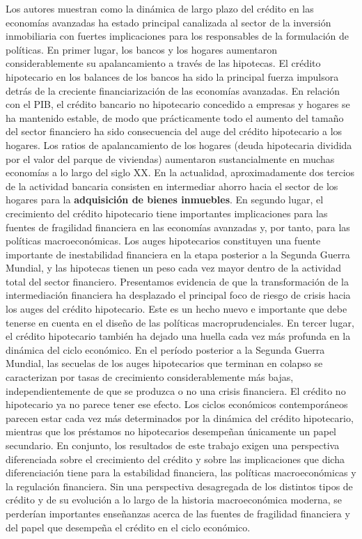 \documentclass[10pt,a4paper]{article}
\begin{document}
Los autores muestran como la dinámica de largo plazo del crédito en las economías avanzadas ha estado principal canalizada al sector de la inversión inmobiliaria con fuertes implicaciones para los responsables de la formulación de políticas. En primer lugar, los bancos y los hogares aumentaron considerablemente su apalancamiento a través de las hipotecas. El crédito hipotecario en los balances de los bancos ha sido la principal fuerza impulsora detrás de la creciente financiarización de las economías avanzadas. En relación con el PIB, el crédito bancario no hipotecario concedido a empresas y hogares se ha mantenido estable, de modo que prácticamente todo el aumento del tamaño del sector financiero ha sido consecuencia del auge del crédito hipotecario a los hogares. Los ratios de apalancamiento de los hogares (deuda hipotecaria dividida por el valor del parque de viviendas) aumentaron sustancialmente en muchas economías a lo largo del siglo XX. En la actualidad, aproximadamente dos tercios de la actividad bancaria consisten en intermediar ahorro hacia el sector de los hogares para la \textbf{adquisición de bienes inmuebles}. En segundo lugar, el crecimiento del crédito hipotecario tiene importantes implicaciones para las fuentes de fragilidad financiera en las economías avanzadas y, por tanto, para las políticas macroeconómicas. Los auges hipotecarios constituyen una fuente importante de inestabilidad financiera en la etapa posterior a la Segunda Guerra Mundial, y las hipotecas tienen un peso cada vez mayor dentro de la actividad total del sector financiero. Presentamos evidencia de que la transformación de la intermediación financiera ha desplazado el principal foco de riesgo de crisis hacia los auges del crédito hipotecario. Este es un hecho nuevo e importante que debe tenerse en cuenta en el diseño de las políticas macroprudenciales. En tercer lugar, el crédito hipotecario también ha dejado una huella cada vez más profunda en la dinámica del ciclo económico. En el período posterior a la Segunda Guerra Mundial, las secuelas de los auges hipotecarios que terminan en colapso se caracterizan por tasas de crecimiento considerablemente más bajas, independientemente de que se produzca o no una crisis financiera. El crédito no hipotecario ya no parece tener ese efecto. Los ciclos económicos contemporáneos parecen estar cada vez más determinados por la dinámica del crédito hipotecario, mientras que los préstamos no hipotecarios desempeñan únicamente un papel secundario. En conjunto, los resultados de este trabajo exigen una perspectiva diferenciada sobre el crecimiento del crédito y sobre las implicaciones que dicha diferenciación tiene para la estabilidad financiera, las políticas macroeconómicas y la regulación financiera. Sin una perspectiva desagregada de los distintos tipos de crédito y de su evolución a lo largo de la historia macroeconómica moderna, se perderían importantes enseñanzas acerca de las fuentes de fragilidad financiera y del papel que desempeña el crédito en el ciclo económico.
\end{document}
